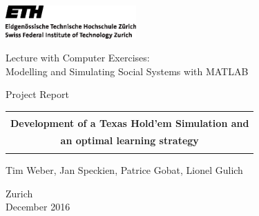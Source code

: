 
\thispagestyle{empty}

\begin{center}
\includegraphics[width=5cm]{ETHlogo.eps}

\bigskip


\bigskip


\bigskip


\LARGE{ 	Lecture with Computer Exercises:\\ }
\LARGE{ Modelling and Simulating Social Systems with MATLAB\\}

\bigskip

\bigskip

\small{Project Report}\\

\bigskip

\bigskip

\bigskip

\bigskip


\begin{tabular}{|c|}
\hline
\\
\textbf{\LARGE{Development of a Texas Hold'em Simulation and}}\\
\textbf{\LARGE{ an optimal learning strategy}}\\
\\
\hline
\end{tabular}
\bigskip

\bigskip

\bigskip

\LARGE{Tim Weber, Jan Speckien, Patrice Gobat, Lionel Gulich}



\bigskip

\bigskip

\bigskip

\bigskip

\bigskip

\bigskip

\bigskip

\bigskip

Zurich\\
December 2016\\

\end{center}


